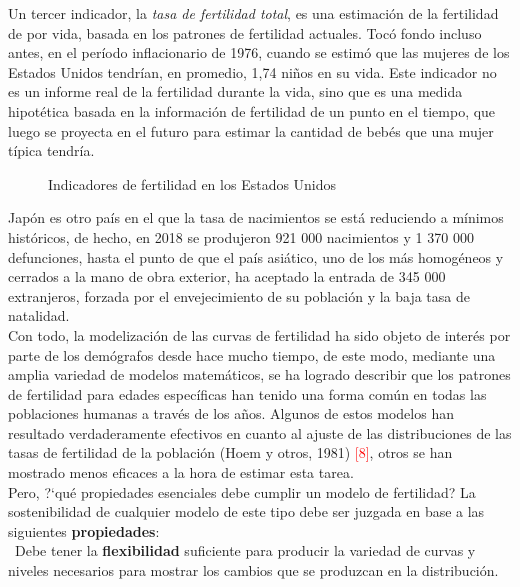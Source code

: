 Un tercer indicador, la \textit{tasa de fertilidad total}, es una estimación de la fertilidad de por vida, basada en los patrones de fertilidad actuales. Tocó fondo incluso antes, en el período inflacionario de 1976, cuando se estimó que las mujeres de los Estados Unidos tendrían, en promedio, 1,74 niños en su vida. Este indicador no es un informe real de la fertilidad durante la vida, sino que es una medida hipotética basada en la información de fertilidad de un punto en el tiempo, que luego se proyecta en el futuro para estimar la cantidad de bebés que una mujer típica tendría.\\

\vspace{-0.3cm}
\begin{figure}[!ht]
\centering
\captionsetup{width=0.94\linewidth}
\caption{Indicadores de fertilidad en los Estados Unidos}
\end{figure}

Japón es otro país en el que la tasa de nacimientos se está reduciendo a mínimos históricos, de hecho, en 2018 se produjeron 921 000 nacimientos y 1 370 000 defunciones, hasta el punto de que el país asiático, uno de los más homogéneos y cerrados a la mano de obra exterior, ha aceptado la entrada de 345 000 extranjeros, forzada por el envejecimiento de su población y la baja tasa de natalidad.\\

Con todo, la modelización de las curvas de fertilidad ha sido objeto de interés por parte de los demógrafos desde hace mucho tiempo, de este modo, mediante una amplia variedad de modelos matemáticos, se ha logrado describir que los patrones de fertilidad para edades específicas han tenido una forma común en todas las poblaciones humanas a través de los años. Algunos de estos modelos han resultado verdaderamente efectivos en cuanto al ajuste de las distribuciones de las tasas de fertilidad de la población (Hoem y otros, 1981) \textcolor{red}{[8]}, otros se han mostrado menos eficaces a la hora de estimar esta tarea.\\

Pero, ?`qué propiedades esenciales debe cumplir un modelo de fertilidad? La sostenibilidad de cualquier modelo de este tipo debe ser juzgada en base a las siguientes \textbf{propiedades}:\\

\textbullet\ Debe tener la \textbf{flexibilidad} suficiente para producir la variedad de curvas y niveles necesarios para mostrar los cambios que se produzcan en la distribución.\\

